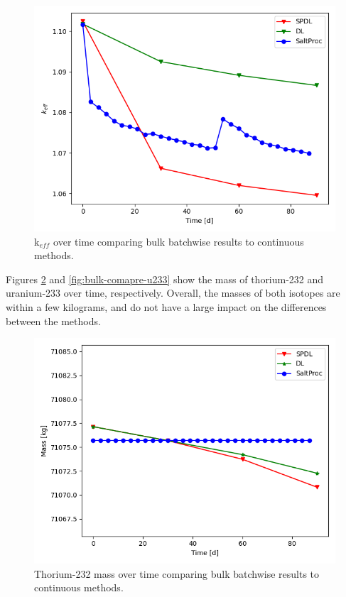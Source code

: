 \begin{figure}[H]
  \centering
  \includegraphics[scale=0.7]{images/soln-3-keff.png}
  \caption{k$_{eff}$ over time comparing bulk batchwise results to continuous methods.}
   \label{fig:bulk-comapre-keff}
\end{figure}

Figures \ref{fig:bulk-comapre-th232} and \ref{fig:bulk-comapre-u233} show the mass of thorium-232 and uranium-233 over time, respectively. Overall, the masses of both isotopes are within a few kilograms, and do not have a large impact on the differences between the methods.

\begin{figure}[H]
  \centering
  \includegraphics[scale=0.7]{images/soln-3-Th232.png}
  \caption{Thorium-232 mass over time comparing bulk batchwise results to continuous methods.}
   \label{fig:bulk-comapre-th232}
\end{figure}

